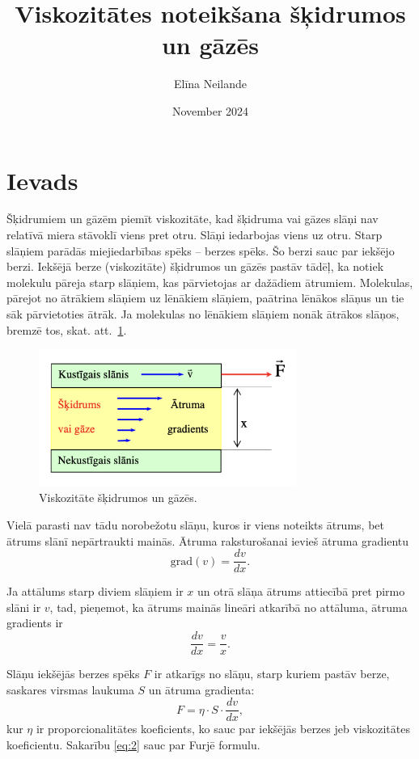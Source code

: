 \documentclass[a4paper]{article}
\title{Viskozitātes noteikšana šķidrumos un gāzēs}
\author{Elīna Neilande}
\date{November 2024}
\begin{document}
\maketitle

\section{Ievads}

Šķidrumiem un gāzēm piemīt viskozitāte, kad šķidruma vai gāzes slāņi nav relatīvā miera stāvoklī viens pret otru. Slāņi iedarbojas viens uz otru. Starp slāņiem parādās miejiedarbības spēks -- berzes spēks. Šo berzi sauc par iekšējo berzi. Iekšējā berze (viskozitāte) šķidrumos un gāzēs pastāv tādēļ, ka notiek molekulu pāreja starp slāņiem, kas pārvietojas ar dažādiem ātrumiem. Molekulas, pārejot no ātrākiem slāņiem uz lēnākiem slāņiem, paātrina lēnākos slāņus un tie sāk pārvietoties ātrāk. Ja molekulas no lēnākiem slāņiem nonāk ātrākos slāņos, bremzē tos, skat. att.~\ref{fig:vis}.

\begin{figure}
    \centering
    \includegraphics[width=0.75\textwidth]{1att.png}
    \caption{Viskozitāte šķidrumos un gāzēs.}
    \label{fig:vis}
\end{figure}

Vielā parasti nav tādu norobežotu slāņu, kuros ir viens noteikts ātrums, bet ātrums slānī nepārtraukti mainās. Ātruma raksturošanai ievieš ātruma gradientu 
\begin{equation}
    \text{grad}(v) = \frac{dv}{dx} .
\end{equation}

Ja attālums starp diviem slāņiem ir \( x \) un otrā slāņa ātrums attiecībā pret pirmo slāni ir \( v \), tad, pieņemot, ka ātrums mainās lineāri atkarībā no attāluma, ātruma gradients ir 
\begin{equation*}
    \frac{dv}{dx} = \frac{v}{x} .
\end{equation*}

Slāņu iekšējās berzes spēks \( F \) ir atkarīgs no slāņu, starp kuriem pastāv berze, saskares virsmas laukuma \( S \) un ātruma gradienta:
\begin{equation} \label{eq:2}
    F = \eta \cdot S \cdot \frac{dv}{dx} ,
\end{equation}
kur \( \eta \) ir proporcionalitātes koeficients, ko sauc par iekšējās berzes jeb viskozitātes koeficientu. Sakarību \ref{eq:2} sauc par Furjē formulu.
\pagebreak
\end{document}
